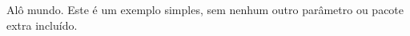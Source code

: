 \documentclass[12pt, a4paper]{report}
\begin{document}
Alô mundo. Este é um exemplo simples, sem nenhum outro parâmetro ou pacote extra incluído.
\end{document}
